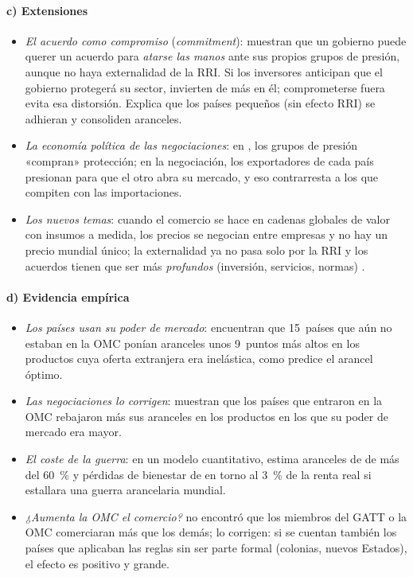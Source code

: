\documentclass[11pt]{article}
\begin{document}
\paragraph{c) Extensiones}

\begin{itemize}
\item \emph{El acuerdo como compromiso} (\emph{commitment}): \textcite{MaggiRodriguezClare1998Value} muestran que un gobierno puede querer un acuerdo para \emph{atarse las manos} ante sus propios grupos de presión, aunque no haya externalidad de la RRI. Si los inversores anticipan que el gobierno protegerá su sector, invierten de más en él; comprometerse fuera evita esa distorsión. Explica que los países pequeños (sin efecto RRI) se adhieran y consoliden aranceles.
\item \emph{La economía política de las negociaciones}: en \textcite{GrossmanHelpman1995TradeWars}, los grupos de presión «compran» protección; en la negociación, los exportadores de cada país presionan para que el otro abra su mercado, y eso contrarresta a los que compiten con las importaciones.
\item \emph{Los nuevos temas}: cuando el comercio se hace en cadenas globales de valor con insumos a medida, los precios se negocian entre empresas y no hay un precio mundial único; la externalidad ya no pasa solo por la RRI y los acuerdos tienen que ser más \emph{profundos} (inversión, servicios, normas)\nocite{AntrasStaiger2012Offshoring} .
\end{itemize}

\paragraph{d) Evidencia empírica}

\begin{itemize}
\item \emph{Los países usan su poder de mercado}: \textcite{BrodaLimaoWeinstein2008Optimal} encuentran que 15~países que aún no estaban en la OMC ponían aranceles unos 9~puntos más altos en los productos cuya oferta extranjera era inelástica, como predice el arancel óptimo.
\item \emph{Las negociaciones lo corrigen}: \textcite{BagwellStaiger2011Negotiators} muestran que los países que entraron en la OMC rebajaron más sus aranceles en los productos en los que su poder de mercado era mayor.
\item \emph{El coste de la guerra}: en un modelo cuantitativo, \textcite{Ossa2014TradeWars} estima aranceles de  de más del 60~\% y pérdidas de bienestar de en torno al 3~\% de la renta real si estallara una guerra arancelaria mundial.
\item \emph{¿Aumenta la OMC el comercio?} \textcite{Rose2004WTO} no encontró que los miembros del GATT o la OMC comerciaran más que los demás; \textcite{TomzGoldsteinRivers2007} lo corrigen: si se cuentan también los países que aplicaban las reglas sin ser parte formal (colonias, nuevos Estados), el efecto es positivo y grande.
\end{itemize}
\end{document}
